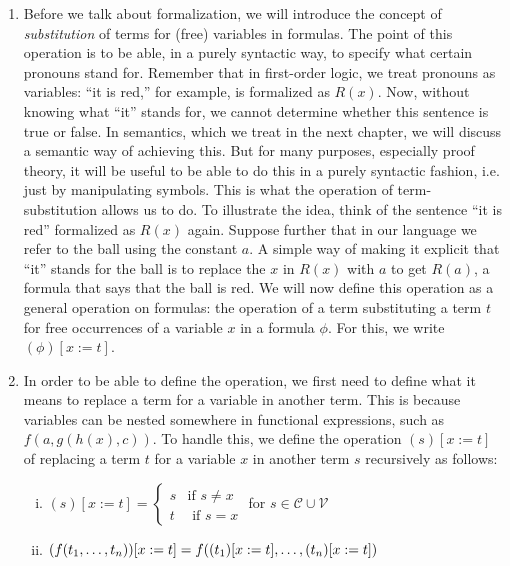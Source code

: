 	\begin{enumerate}[\thesection.1]

		\item Before we talk about formalization, we will introduce the concept of \emph{substitution} of terms for (free) variables in formulas. The point of this operation is to be able, in a purely syntactic way, to specify what certain pronouns stand for. Remember that in first-order logic, we treat pronouns as variables: ``it is red,'' for example, is formalized as $R(x)$. Now, without knowing what ``it'' stands for, we cannot determine whether this sentence is true or false. In semantics, which we treat in the next chapter, we will discuss a semantic way of achieving this. But for many purposes, especially proof theory, it will be useful to be able to do this in a purely syntactic fashion, i.e. just by manipulating symbols. This is what the operation of term-substitution allows us to do. To illustrate the idea, think of the sentence ``it is red'' formalized as $R(x)$ again. Suppose further that in our language we refer to the ball using the constant $a$. A simple way of making it explicit that ``it'' stands for the ball is to replace the $x$ in $R(x)$ with $a$ to get $R(a)$, a formula that says that the ball is red. We will now define this operation as a general operation on formulas: the operation of a term substituting a term $t$ for free occurrences of a variable $x$ in a formula $\phi$. For this, we write $(\phi)[x:=t]$.
			
		\item In order to be able to define the operation, we first need to define what it means to replace a term for a variable in another term. This is because variables can be nested somewhere in functional expressions, such as $f(a, g(h(x),c))$. To handle this, we define the operation $(s)[x:=t]$ of replacing a term $t$ for a variable $x$ in another term $s$ recursively as follows:
		
			\begin{enumerate}[(i)]
			
				\item $(s)[x:=t]=\begin{cases} s & \text{if } s\neq x\\ t & \text{ if }s=x\end{cases}$ for $s\in \mathcal{C}\cup\mathcal{V}$
				
				\item $(f(t_1,\mathellipsis, t_n))[x:=t]=f((t_1)[x:=t], \mathellipsis, (t_n)[x:=t])$
			

\end{enumerate}
\end{enumerate}
